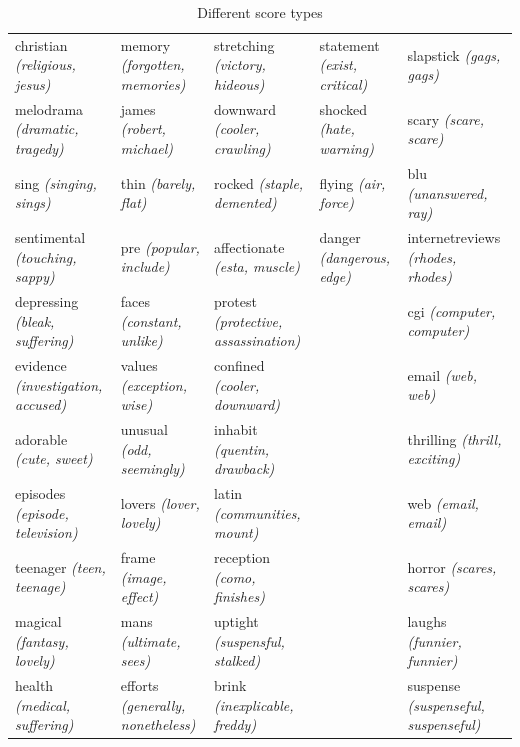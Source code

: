 \begin{landscape}
\begin{table}[]
\begin{tabular}{lllll}
			christian \textit{(religious, jesus)}      & memory \textit{(forgotten, memories)}     & stretching \textit{(victory, hideous)}           & statement \textit{(exist, critical)}        & slapstick \textit{(gags, gags)}               \\
			melodrama \textit{(dramatic, tragedy)}     & james \textit{(robert, michael)}          & downward \textit{(cooler, crawling)}             & shocked \textit{(hate, warning)}            & scary \textit{(scare, scare)}                 \\
			sing \textit{(singing, sings)}             & thin \textit{(barely, flat)}              & rocked \textit{(staple, demented)}               & flying \textit{(air, force)}                & blu \textit{(unanswered, ray)}                \\
			sentimental \textit{(touching, sappy)}     & pre \textit{(popular, include)}           & affectionate \textit{(esta, muscle)}             & danger \textit{(dangerous, edge)}           & internetreviews \textit{(rhodes, rhodes)}     \\
			depressing \textit{(bleak, suffering)}     & faces \textit{(constant, unlike)}         & protest \textit{(protective, assassination)}     &                                    & cgi \textit{(computer, computer)}             \\
			evidence \textit{(investigation, accused)} & values \textit{(exception, wise)}         & confined \textit{(cooler, downward)}             &                                    & email \textit{(web, web)}                     \\
			adorable \textit{(cute, sweet)}            & unusual \textit{(odd, seemingly)}         & inhabit \textit{(quentin, drawback)}             &                                    & thrilling \textit{(thrill, exciting)}         \\
			episodes \textit{(episode, television)}    & lovers \textit{(lover, lovely)}           & latin \textit{(communities, mount)}              &                                    & web \textit{(email, email)}                   \\
			teenager \textit{(teen, teenage)}          & frame \textit{(image, effect)}            & reception \textit{(como, finishes)}              &                                    & horror \textit{(scares, scares)}              \\
			magical \textit{(fantasy, lovely)}         & mans \textit{(ultimate, sees)}            & uptight \textit{(suspensful, stalked)}           &                                    & laughs \textit{(funnier, funnier)}            \\
			health \textit{(medical, suffering)}       & efforts \textit{(generally, nonetheless)} & brink \textit{(inexplicable, freddy)}            &                                    & suspense \textit{(suspenseful, suspenseful)} 
		\end{tabular}
		\caption{Different score types}
	\end{table}
\end{landscape}

